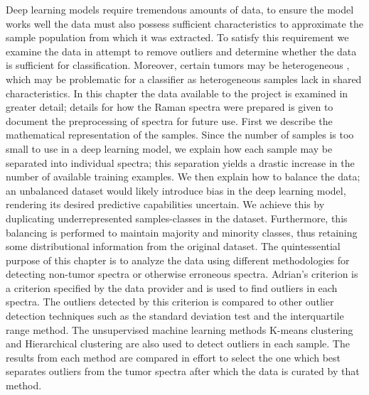 Deep learning models require tremendous amounts of data, to ensure the model works well the data must also possess sufficient characteristics to approximate the sample population from which it was extracted. To satisfy this requirement we examine the data in attempt to remove outliers and determine whether the data is sufficient for classification. Moreover, certain tumors may be heterogeneous \cite{friedmann2014glioblastoma}, which may be problematic for a classifier as heterogeneous samples lack in shared characteristics. In this chapter the data available to the project is examined in greater detail; details for how the Raman spectra were prepared is given to document the preprocessing of spectra for future use. First we describe the mathematical representation of the samples. Since the number of samples is too small to use in a deep learning model, we explain how each sample may be separated into individual spectra; this separation yields a drastic increase in the number of available training examples. We then explain how to balance the data; an unbalanced dataset would likely introduce bias in the deep learning model, rendering its desired predictive capabilities uncertain. We achieve this by duplicating underrepresented samples-classes in the dataset. Furthermore, this balancing is performed to maintain majority and minority classes, thus retaining some distributional information from the original dataset. The quintessential purpose of this chapter is to analyze the data using different methodologies for detecting non-tumor spectra or otherwise erroneous spectra.  Adrian's criterion is a criterion specified by the data provider and is used to find outliers in each spectra. The outliers detected by this criterion is compared to other outlier detection techniques such as the standard deviation test and the interquartile range method. The unsupervised machine learning methods K-means clustering and Hierarchical clustering are also used to detect outliers in each sample. The results from each method are compared in effort to select the one which best separates outliers from the tumor spectra after which the data is curated by that method.
